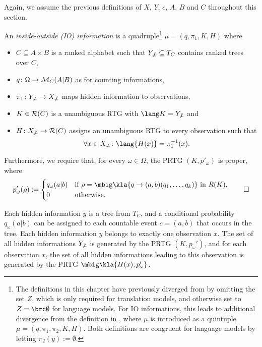Again, we assume the previous definitions of $X$, $Y$, $c$, $A$, $B$ and $C$
throughout this section.

\begin{definition}\label{02:def-io-info}
 An \emph{inside-outside (IO) information} is a quadruple\footnote{The definitions
 in this chapter have previously diverged from \cite{bucstuvog15} by omitting
 the set $Z$, which is only required for translation models, and otherwise set
 to $Z=\brc\emptyset$ for language models. For IO informations, this leads to
 additional divergence from the definition in \cite{bucstuvog15}, where $\mu$
 is introduced as a quintuple $\mu=(q,\pi_1,\pi_2,K,H)$. Both definitions are
 congruent for language models by letting $\pi_2(y) :=
 \emptyset$.} $\mu = (q,\pi_1,K,H)$ where
 \begin{itemize}\setlength\itemsep{-0.3em}
  \item $C\subseteq A\times B$ is a ranked alphabet such that $Y_{\not\bot}\subseteq T_C$ contains ranked trees over $C$,
  \item $q\colon\Omega\to\mathcal M_C(A|B)$ as for counting informations,
  \item $\pi_1\colon Y_{\not\bot}\to X_{\not\bot}$ maps hidden information to observations,
  \item $K\in\mathcal R(C)$ is a unambiguous RTG with $\lang K = Y_{\not\bot}$ and
  \item $H\colon X_{\not\bot}\to\mathcal R(C)$ assigns an unambiguous RTG to every observation such that 
   \[
    \forall x\in X_{\not\bot}\colon \lang{H(x)} = \pi_1^{-1}(x).
   \]
 \end{itemize}
 Furthermore, we require that, for every $\omega\in\Omega$, the PRTG $(K,p'_\omega)$ is proper, where
 \[
  p'_\omega(\rho) := \begin{cases}
   q_\omega(a|b) & \text{if } \rho=\mbig\kla{q\to(a,b)(q_1,\ldots,q_k)}\isin R(K),
   \\ 0 & \text{otherwise}.
  \end{cases}\qedhere
 \]
\end{definition}

Each hidden information $y$ is a tree from $T_C$, and a conditional probability
$q_\omega(a|b)$ can be assigned to each countable event $c = (a,b)$ that occurs
in the tree. Each hidden information $y$ belongs to exactly one observation
$x$. The set of all hidden informations $Y_{\not\bot}$ is generated by the PRTG
$(K,p_\omega')$, and for each observation $x$, the set of all hidden
informations leading to this observation is generated by the PRTG
$\mbig\kla{H(x),p_\omega'}$.

